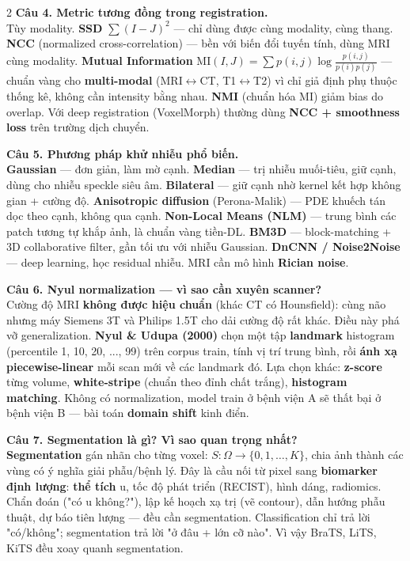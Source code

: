 \begin{paracol}{2}
\textbf{Câu 4. Metric tương đồng trong registration.}\\
Tùy modality. \textbf{SSD} $\sum (I-J)^2$ — chỉ dùng được cùng modality, cùng thang. \textbf{NCC} (normalized cross-correlation) — bền với biến đổi tuyến tính, dùng MRI cùng modality. \textbf{Mutual Information} \(\mathrm{MI}(I,J)=\sum p(i,j)\log\frac{p(i,j)}{p(i)p(j)}\) — chuẩn vàng cho \textbf{multi-modal} (MRI$\leftrightarrow$CT, T1$\leftrightarrow$T2) vì chỉ giả định phụ thuộc thống kê, không cần intensity bằng nhau. \textbf{NMI} (chuẩn hóa MI) giảm bias do overlap. Với deep registration (VoxelMorph) thường dùng \textbf{NCC + smoothness loss} trên trường dịch chuyển.

\textbf{Câu 5. Phương pháp khử nhiễu phổ biến.}\\
\textbf{Gaussian} — đơn giản, làm mờ cạnh. \textbf{Median} — trị nhiễu muối-tiêu, giữ cạnh, dùng cho nhiễu speckle siêu âm. \textbf{Bilateral} — giữ cạnh nhờ kernel kết hợp không gian + cường độ. \textbf{Anisotropic diffusion} (Perona-Malik) — PDE khuếch tán dọc theo cạnh, không qua cạnh. \textbf{Non-Local Means (NLM)} — trung bình các patch tương tự khắp ảnh, là chuẩn vàng tiền-DL. \textbf{BM3D} — block-matching + 3D collaborative filter, gần tối ưu với nhiễu Gaussian. \textbf{DnCNN / Noise2Noise} — deep learning, học residual nhiễu. MRI cần mô hình \textbf{Rician noise}.

\textbf{Câu 6. Nyul normalization — vì sao cần xuyên scanner?}\\
Cường độ MRI \textbf{không được hiệu chuẩn} (khác CT có Hounsfield): cùng não nhưng máy Siemens 3T và Philips 1.5T cho dải cường độ rất khác. Điều này phá vỡ generalization. \textbf{Nyul \& Udupa (2000)} chọn một tập \textbf{landmark} histogram (percentile 1, 10, 20, ..., 99) trên corpus train, tính vị trí trung bình, rồi \textbf{ánh xạ piecewise-linear} mỗi scan mới về các landmark đó. Lựa chọn khác: \textbf{z-score} từng volume, \textbf{white-stripe} (chuẩn theo đỉnh chất trắng), \textbf{histogram matching}. Không có normalization, model train ở bệnh viện A sẽ thất bại ở bệnh viện B — bài toán \textbf{domain shift} kinh điển.

\textbf{Câu 7. Segmentation là gì? Vì sao quan trọng nhất?}\\
\textbf{Segmentation} gán nhãn cho từng voxel: $S:\Omega\to\{0,1,\ldots,K\}$, chia ảnh thành các vùng có ý nghĩa giải phẫu/bệnh lý. Đây là cầu nối từ pixel sang \textbf{biomarker định lượng}: \textbf{thể tích} u, tốc độ phát triển (RECIST), hình dáng, radiomics. Chẩn đoán ("có u không?"), lập kế hoạch xạ trị (vẽ contour), dẫn hướng phẫu thuật, dự báo tiên lượng — đều cần segmentation. Classification chỉ trả lời "có/không"; segmentation trả lời "ở đâu + lớn cỡ nào". Vì vậy BraTS, LiTS, KiTS đều xoay quanh segmentation.


\end{paracol}
